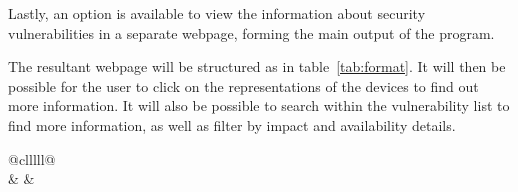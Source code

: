 Lastly, an option is available to view the information about security
vulnerabilities in a separate webpage, forming the main output of the
program.

The resultant webpage will be structured as in table~\ref{tab:format}.  It
will then be possible for the user to click on the representations of the
devices to find out more information.  It will also be possible to search
within the vulnerability list to find more information, as well as filter by
impact and availability details.

  \begin{table}[] \centering \begin{tabular}{@{}clllll@{}} \toprule
                                                                                                                                                                                                                                          \\
    \midrule {} &  &  \\
                                                                                                                                                                                                    \\
                                                                                                                                                                                      \\
                                                      \\
                                                                                                                                                                                                                \\
    \bottomrule \end{tabular} \caption{Format of presented data found in e-mail
    header}\label{tab:format} \end{table}

